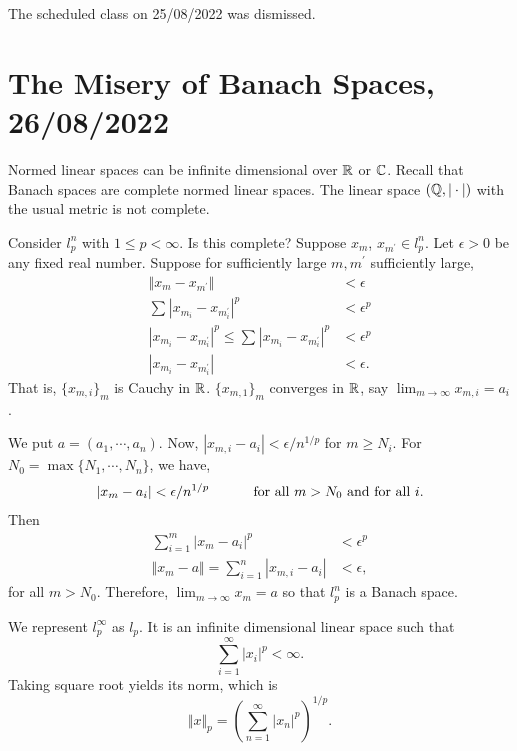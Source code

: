 \documentclass{amsart}
\begin{document}

The scheduled class on 25/08/2022 was dismissed.

\section{The Misery of Banach Spaces, 26/08/2022}

Normed linear spaces can be infinite dimensional over $\mathbb{R}$ or $\mathbb{C}$. Recall that Banach spaces are complete normed linear spaces. The linear space $(\mathbb{Q}, |\cdot|)$ with the usual metric is not complete.


Consider $l_p^n$ with $1\leq p < \infty$. Is this complete? Suppose $x_m$, $x_{m^{\prime}}\in l_p^n$. Let $\epsilon > 0$ be any fixed real number. Suppose for sufficiently large $m, m^{\prime}$ sufficiently large,
\begin{align*}
  \Vert x_m - x_{m^{\prime}} \Vert &< \epsilon \\
  \sum_{}^{} |x_{m_i}-x_{m^{\prime}_i}|^p &< \epsilon^p \\
  |x_{m_i}-x_{m^{\prime}_i} |^p \leq \sum_{}^{} |x_{m_i}-x_{m^{\prime}_i}|^p &< \epsilon^p \\
  |x_{m_i}-x_{m^{\prime}_i} | &< \epsilon.
\end{align*}
That is, $\{x_{m,i}\}_m$ is Cauchy in $\mathbb{R}$. $\{x_{m,1}\}_m$ converges in $\mathbb{R}$, say $\displaystyle \lim_{m\to\infty} x_{m,i} = a_i$.

We put $a=(a_1, \cdots, a_n)$. Now, $|x_{m,i}-a_i| < \epsilon/n^{1/p}$ for $m \geq N_i$. For $N_0 = \max\{N_1, \cdots, N_n\}$, we have,
\begin{align*}
|x_m-a_i| < \epsilon/n^{1/p} \hspace*{1cm}\text{ for all $m>N_0$ and for all $i$}.
\end{align*}
Then 
\begin{align*}
  \sum_{i=1}^m |x_m-a_i|^p &< \epsilon^p \\
  \Vert x_m-a \Vert = \sum_{i=1}^n |x_{m,i}-a_i | &< \epsilon,
\end{align*}
for all $m > N_0$. Therefore, $\displaystyle \lim_{m\to\infty} x_m = a$ so that $l_p^n$ is a Banach space.

We represent $l_p^{\infty}$ as $l_p$. It is an infinite dimensional linear space such that
\begin{displaymath}
\sum_{i=1}^{\infty} |x_i|^p < \infty.
\end{displaymath}
Taking square root yields its norm, which is 
\begin{equation}
\label{eq:2}
\Vert x \Vert _p = \left( \sum_{n=1}^{\infty} |x_n|^p \right)^{1/p}.
\end{equation}
\end{document}
